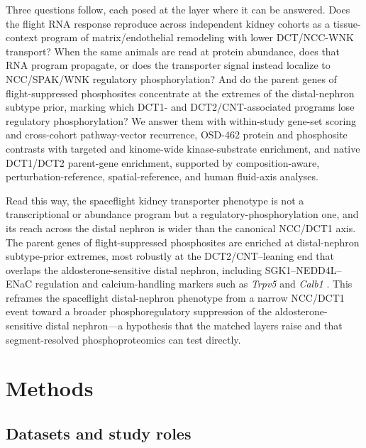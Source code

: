 \documentclass[11pt]{article}
\newcommand{\gene}[1]{\textit{#1}}
\begin{document}
Three questions follow, each posed at the layer where it can be answered. Does the flight RNA response reproduce across independent kidney cohorts as a tissue-context program of matrix/endothelial remodeling with lower DCT/NCC-WNK transport? When the same animals are read at protein abundance, does that RNA program propagate, or does the transporter signal instead localize to NCC/SPAK/WNK regulatory phosphorylation? And do the parent genes of flight-suppressed phosphosites concentrate at the extremes of the distal-nephron subtype prior, marking which DCT1- and DCT2/CNT-associated programs lose regulatory phosphorylation? We answer them with within-study gene-set scoring and cross-cohort pathway-vector recurrence, OSD-462 protein and phosphosite contrasts with targeted and kinome-wide kinase-substrate enrichment, and native DCT1/DCT2 parent-gene enrichment, supported by composition-aware, perturbation-reference, spatial-reference, and human fluid-axis analyses.

Read this way, the spaceflight kidney transporter phenotype is not a transcriptional or abundance program but a regulatory-phosphorylation one, and its reach across the distal nephron is wider than the canonical NCC/DCT1 axis. The parent genes of flight-suppressed phosphosites are enriched at distal-nephron subtype-prior extremes, most robustly at the DCT2/CNT--leaning end that overlaps the aldosterone-sensitive distal nephron, including SGK1--NEDD4L--ENaC regulation and calcium-handling markers such as \gene{Trpv5} and \gene{Calb1} \citep{arroyo2011aldosterone,subramanya2014dct,su2024dct}. This reframes the spaceflight distal-nephron phenotype from a narrow NCC/DCT1 event toward a broader phosphoregulatory suppression of the aldosterone-sensitive distal nephron---a hypothesis that the matched layers raise and that segment-resolved phosphoproteomics can test directly.

\section{Methods}

\subsection{Datasets and study roles}
\end{document}
